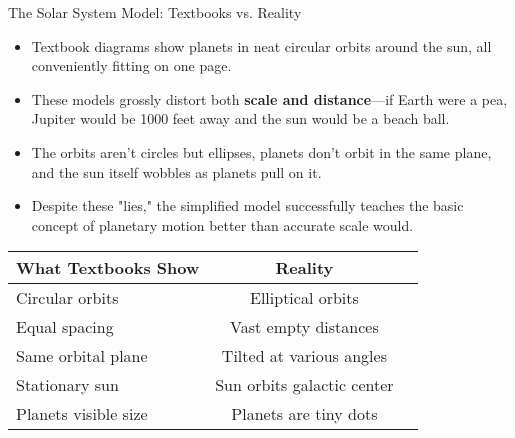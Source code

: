 \documentclass{beamer}
\begin{document}
	\begin{frame}{The Solar System Model: Textbooks vs. Reality}
		\begin{itemize}
			\item Textbook diagrams show planets in neat circular orbits around the sun, all conveniently fitting on one page.
			\item These models grossly distort both \textbf{scale and distance}—if Earth were a pea, Jupiter would be 1000 feet away and the sun would be a beach ball.
			\item The orbits aren't circles but ellipses, planets don't orbit in the same plane, and the sun itself wobbles as planets pull on it.
			\item Despite these "lies," the simplified model successfully teaches the basic concept of planetary motion better than accurate scale would.
		\end{itemize}
		
		\begin{table}
			\centering
			\small
			\begin{tabular}{lcc}
				\toprule
				What Textbooks Show & Reality \\
				\midrule
				Circular orbits & Elliptical orbits \\
				Equal spacing & Vast empty distances \\
				Same orbital plane & Tilted at various angles \\
				Stationary sun & Sun orbits galactic center \\
				Planets visible size & Planets are tiny dots \\
				\bottomrule
			\end{tabular}
		\end{table}
	\end{frame}
	
\end{document}

